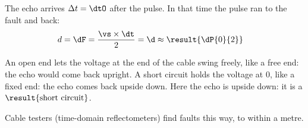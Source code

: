 \begin{abcliste}
\abc The echo arrives $\Delta t = \dtO$ after the pulse. In that time the pulse ran to the fault and back:
\begin{align}
 d &= \dF = \frac{\vs\times\dt}{2} = \d \approx \result{\dP{0}{2}}
\end{align}

\abc An open end lets the voltage at the end of the cable swing freely, like a free end: the echo would come back upright. A short circuit holds the voltage at 0, like a fixed end: the echo comes back upside down. Here the echo is upside down: it is a $\result{\text{short circuit}}$.

Cable testers (time-domain reflectometers) find faults this way, to within a metre.
\end{abcliste}
